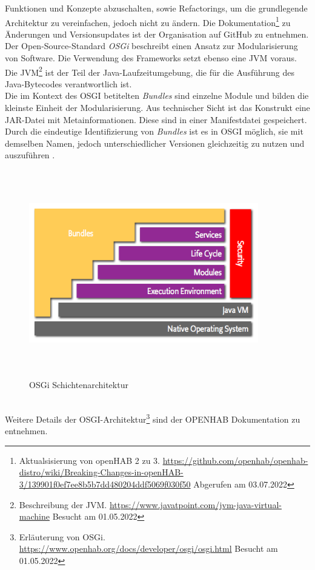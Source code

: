     Funktionen und Konzepte abzuschalten, sowie Refactorings, um die grundlegende Architektur zu vereinfachen, jedoch nicht zu ändern. 
    Die Dokumentation\footnote{Aktualsisierung von openHAB 2 zu 3. \url{https://github.com/openhab/openhab-distro/wiki/Breaking-Changes-in-openHAB-3/139901f0ef7ee8b5b7dd480204ddf5069f030f50} Abgerufen am 03.07.2022} 
    zu Änderungen und Versionsupdates ist der Organisation auf GitHub zu entnehmen.
    \\
    \linebreak
    Der Open-Source-Standard \textit{OSGi} beschreibt einen Ansatz zur Modularisierung von Software. Die Verwendung des 
    Frameworks setzt ebenso eine \ac{JVM} voraus. 
    Die \acl{JVM}\footnote{Beschreibung der JVM. \url{https://www.javatpoint.com/jvm-java-virtual-machine} Besucht am 01.05.2022} 
    ist der Teil der Java-Laufzeitumgebung, die für die Ausführung des Java-Bytecodes verantwortlich ist.
    \\
    Die im Kontext des \acs{OSGI} betitelten \textit{Bundles} sind einzelne Module und bilden die kleinste Einheit der Modularisierung. Aus technischer Sicht ist 
    das Konstrukt eine \ac{JAR}-Datei mit Metainformationen. Diese sind in einer Manifestdatei gespeichert. Durch die eindeutige 
    Identifizierung von \textit{Bundles} ist es in \acs{OSGI} möglich, sie mit demselben Namen, jedoch unterschiedlicher 
    Versionen gleichzeitig zu nutzen und auszuführen \cite{openHAB-article}. 
    \begin{figure}[hbt!]
        \centering
        \includegraphics[width=10cm,height=9cm,keepaspectratio]{images/osgi-architecture.png}
        \caption{OSGi Schichtenarchitektur \cite{openhab-osgi}}
        \label{fig:osgilayer}
    \end{figure}
    \\
    Weitere Details der \acs{OSGI}-Architektur\footnote{Erläuterung von OSGi. \url{https://www.openhab.org/docs/developer/osgi/osgi.html} Besucht am 01.05.2022} 
    sind der \acs{OPENHAB} Dokumentation zu entnehmen.

